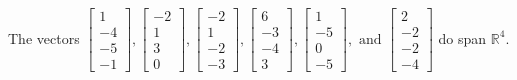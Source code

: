 \begin{exercise}
\begin{exerciseStatement}
  \end{exerciseStatement}
  \begin{exerciseAnswer}
   The vectors \(\left[\begin{array}{r}
1 \\
-4 \\
-5 \\
-1
\end{array}\right] , \left[\begin{array}{r}
-2 \\
1 \\
3 \\
0
\end{array}\right] , \left[\begin{array}{r}
-2 \\
1 \\
-2 \\
-3
\end{array}\right] , \left[\begin{array}{r}
6 \\
-3 \\
-4 \\
3
\end{array}\right] , \left[\begin{array}{r}
1 \\
-5 \\
0 \\
-5
\end{array}\right] , \text{ and } \left[\begin{array}{r}
2 \\
-2 \\
-2 \\
-4
\end{array}\right]\) 
  	 do  
	span \(\mathbb{R}^4\).
  


  \end{exerciseAnswer}
\end{exercise}